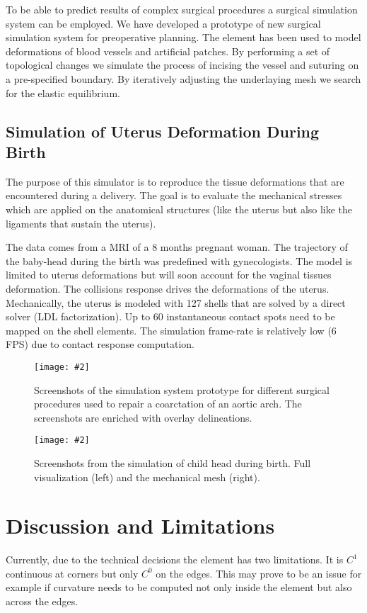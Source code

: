 \documentclass{egpubl}
\newcommand{\FigureW}[3]{%
\begin{figure*}[htb]
  \centering
  \texttt{[image: \#2]}
  \caption{\label{fig-#2}#3}
\end{figure*}}
\begin{document}
To be able to predict results of complex surgical procedures a surgical simulation system can be employed.
We have
developed a prototype \cite{Anonymous2012} of new surgical simulation system
for preoperative planning. The element has been used to model deformations of
blood vessels and artificial patches. By performing a set of topological changes
we simulate the process of incising the vessel and suturing on a pre-specified
boundary. By iteratively adjusting the underlaying mesh we search for the
elastic equilibrium.


\subsection{Simulation of Uterus Deformation During Birth}

The purpose of this simulator is to reproduce the tissue deformations that are encountered during a delivery.
The goal is to evaluate the mechanical stresses which are applied on the anatomical structures (like the uterus but also like the ligaments that sustain the uterus).

The data comes from a MRI of a 8 months pregnant woman. 
The trajectory of the baby-head during the birth was predefined with gynecologists. 
The model is limited to uterus deformations but will soon account for the vaginal tissues deformation.
The collisions response drives the deformations of the uterus.
Mechanically, the uterus is modeled with 127 shells that are solved by a direct solver (LDL factorization).
Up to 60 instantaneous contact spots need to be mapped on the shell elements. 
The simulation frame-rate is relatively low (6 FPS) due to contact response computation.

\FigureW{\linewidth}{chd}
{Screenshots of the simulation system prototype for different surgical
procedures used to repair a coarctation of an aortic arch. The screenshots
are enriched with overlay delineations.}

\FigureW{\linewidth}{birth}
{Screenshots from the simulation of child head during birth. Full visualization (left) and the mechanical mesh (right).}



\section{Discussion and Limitations} %

Currently, due to the technical decisions the element has two limitations.
It is $C^1$ continuous at corners but only $C^0$ on the
edges. This may prove to be an issue for example if curvature needs to be
computed not only inside the element but also across the edges.
\end{document}
